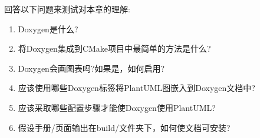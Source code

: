 回答以下问题来测试对本章的理解:

\begin{enumerate}
\item 
Doxygen是什么?

\item 
将Doxygen集成到CMake项目中最简单的方法是什么?

\item 
Doxygen会画图表吗?如果是，如何启用?

\item 
应该使用哪些Doxygen标签将PlantUML图嵌入到Doxygen文档中?

\item 
应该采取哪些配置步骤才能使Doxygen使用PlantUML?

\item 
假设手册/页面输出在build/文件夹下，如何使文档可安装?
\end{enumerate}